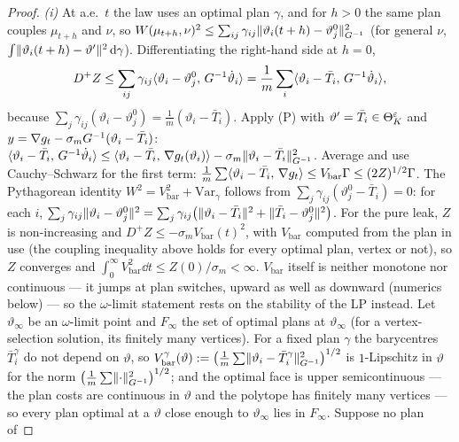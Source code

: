 \begin{proof}
\textit{(i)} At a.e.\ $t$ the law uses an optimal plan $\gamma$, and for $h>0$ the same plan couples $\mu_{t+h}$ and
$\nu$, so $W(\mu_{t+h},\nu)^2 \le \sum_{ij}\gamma_{ij}\lVert \vartheta_i(t+h) - \vartheta^0_j\rVert^2_{G^{-1}}$ (for general
$\nu$, $\int\lVert \vartheta_i(t+h) - \vartheta'\rVert^2\,\mathrm{d}\gamma$). Differentiating the right-hand side at $h = 0$,
\[
  D^+Z \le \sum_{ij}\gamma_{ij}\langle \vartheta_i - \vartheta^0_j,\, G^{-1}\dot\vartheta_i\rangle
  = \frac1m\sum_i\langle \vartheta_i - \bar T_i,\, G^{-1}\dot\vartheta_i\rangle,
\]
because $\sum_j\gamma_{ij}(\vartheta_i - \vartheta^0_j) = \frac1m(\vartheta_i - \bar T_i)$. Apply (P) with
$\vartheta' = \bar T_i\in\Theta_K^{\varepsilon}$ and $y = \nabla g_t - \sigma_mG^{-1}(\vartheta_i - \bar T_i)$:
$\langle \vartheta_i - \bar T_i,\, G^{-1}\dot\vartheta_i\rangle \le \langle \vartheta_i - \bar T_i,\, \nabla g_t(\vartheta_i)\rangle
- \sigma_m\lVert \vartheta_i - \bar T_i\rVert^2_{G^{-1}}$. Average and use Cauchy--Schwarz for the first term:
$\frac1m\sum\langle \vartheta_i - \bar T_i,\, \nabla g_t\rangle \le V_{\mathrm{bar}}\Gamma \le (2Z)^{1/2}\Gamma$. The Pythagorean
identity $W^2 = V_{\mathrm{bar}}^2 + \mathrm{Var}_\gamma$ follows from $\sum_j\gamma_{ij}(\vartheta^0_j - \bar T_i) = 0$:
for each $i$, $\sum_j\gamma_{ij}\lVert \vartheta_i - \vartheta^0_j\rVert^2
= \sum_j\gamma_{ij}\bigl(\lVert \vartheta_i - \bar T_i\rVert^2 + \lVert \bar T_i - \vartheta^0_j\rVert^2\bigr)$. For the pure
leak, $Z$ is non-increasing and $D^+Z \le -\sigma_mV_{\mathrm{bar}}(t)^2$, with $V_{\mathrm{bar}}$ computed from the
plan in use (the coupling inequality above holds for every optimal plan, vertex or not), so $Z$ converges and
$\int_0^\infty V_{\mathrm{bar}}^2\dd t \le Z(0)/\sigma_m < \infty$. $V_{\mathrm{bar}}$ itself is neither monotone nor
continuous --- it jumps at plan switches, upward as well as downward (numerics below) --- so the $\omega$-limit
statement rests on the stability of the LP instead. Let $\vartheta_\infty$ be an $\omega$-limit point and $F_\infty$
the set of optimal plans at $\vartheta_\infty$ (for a vertex-selection solution, its finitely many vertices). For a
fixed plan $\gamma$ the barycentres $\bar T^\gamma_i$ do not depend on $\vartheta$, so
$V_{\mathrm{bar}}^\gamma(\vartheta) := \bigl(\frac1m\sum\lVert \vartheta_i - \bar T^\gamma_i\rVert^2_{G^{-1}}\bigr)^{1/2}$ is
$1$-Lipschitz in $\vartheta$ for the norm $\bigl(\frac1m\sum\lVert \cdot\rVert^2_{G^{-1}}\bigr)^{1/2}$; and the optimal face
is upper semicontinuous --- the plan costs are continuous in $\vartheta$ and the polytope has finitely many vertices
--- so every plan optimal at a $\vartheta$ close enough to $\vartheta_\infty$ lies in $F_\infty$. Suppose no plan of

\end{proof}
